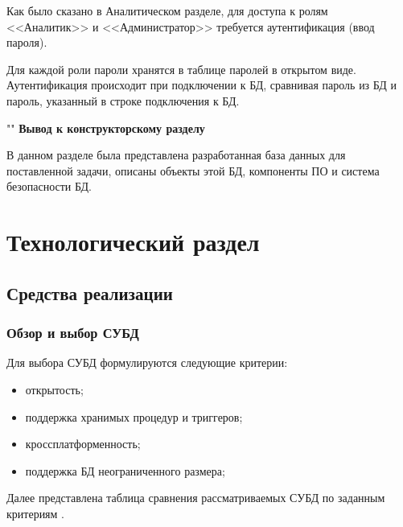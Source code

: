 \documentclass[a4paper]{bmstu}
\begin{document}
Как было сказано в Аналитическом разделе, для доступа к ролям <<Аналитик>> и <<Администратор>> требуется аутентификация (ввод пароля).

Для каждой роли пароли хранятся в таблице паролей в открытом виде. Аутентификация происходит при подключении к БД, сравнивая пароль из БД и пароль, указанный в строке подключения к БД.

""\newline
\noindent\textbf{Вывод к конструкторскому разделу}

В данном разделе была представлена разработанная база данных для поставленной задачи, описаны объекты этой БД, компоненты ПО и система безопасности БД.

\chapter{Технологический раздел}

\section{Средства реализации}

\subsection*{Обзор и выбор СУБД}

Для выбора СУБД формулируются следующие критерии:

\begin{itemize}
	\item открытость;
	\item поддержка хранимых процедур и триггеров;
	\item кроссплатформенность;
	\item поддержка БД неограниченного размера;
\end{itemize}

Далее представлена таблица сравнения рассматриваемых СУБД по заданным критериям \cite{orc-db, mssql, pg, db2}.
\end{document}
